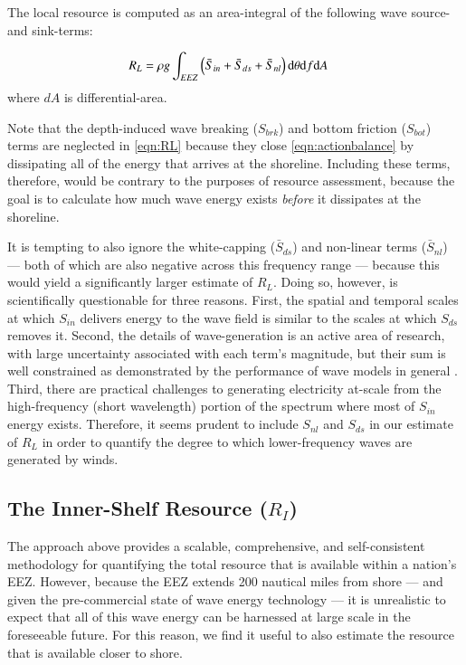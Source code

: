 The local resource is computed as an area-integral of the following wave source- and sink-terms:

\begin{align}
  R_L &= \rho g \int_{EEZ}\relax \left ( \bar{S}_{in} + \bar{S}_{ds} + \bar{S}_{nl} \right ) \mathrm{d} \theta \mathrm{d} f \mathrm{d} A
\label{eqn:RL}
\end{align}
where $dA$ is differential-area.

Note that the depth-induced wave breaking ($S_{brk}$) and bottom friction ($S_{bot}$) terms are neglected in \eqref{eqn:RL} because they close \eqref{eqn:actionbalance} by dissipating all of the energy that arrives at the shoreline. Including these terms, therefore, would be contrary to the purposes of resource assessment, because the goal is to calculate how much wave energy exists \textit{before} it dissipates at the shoreline.

It is tempting to also ignore the white-capping ($\bar{S}_{ds}$) and non-linear terms ($\bar{S}_{nl}$) — both of which are also negative across this frequency range — because this would yield a significantly larger estimate of $R_L$. Doing so, however, is scientifically questionable for three reasons. First, the spatial and temporal scales at which $S_{in}$ delivers energy to the wave field is similar to the scales at which $S_{ds}$ removes it. Second, the details of wave-generation is an active area of research, with large uncertainty associated with each term's magnitude, but their sum is well constrained as demonstrated by the performance of wave models in general \citep[e.g.][]{ardhuin_semiempirical_2010,van_vledder_source_2016}. Third, there are practical challenges to generating electricity at-scale from the high-frequency (short wavelength) portion of the spectrum where most of $S_{in}$ energy exists. Therefore, it seems prudent to include $S_{nl}$ and $S_{ds}$ in our estimate of $R_L$ in order to quantify the degree to which lower-frequency waves are generated by winds.

\subsection{The Inner-Shelf Resource ($R_I$)}

The approach above provides a scalable, comprehensive, and self-consistent methodology for quantifying the total resource that is available within a nation's EEZ. However, because the EEZ extends 200 nautical miles from shore — and given the pre-commercial state of wave energy technology — it is unrealistic to expect that all of this wave energy can be harnessed at large scale in the foreseeable future. For this reason, we find it useful to also estimate the resource that is available closer to shore.

